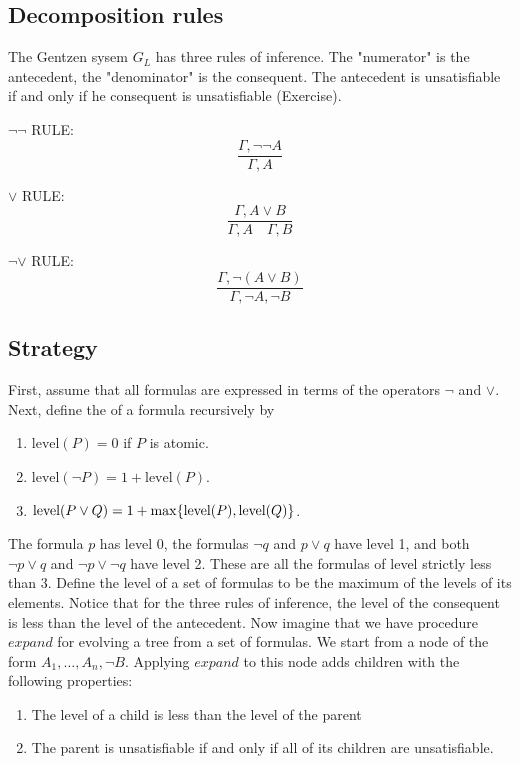 \subsection{Decomposition rules}

The Gentzen sysem $G_L$ has three rules of inference.    The "numerator" is the antecedent, the "denominator" is the consequent.  The antecedent is unsatisfiable if and only if he consequent is unsatisfiable (Exercise).

$\neg\neg$ RULE: $$\frac{\Gamma, \neg\neg A}{\Gamma, A} $$

$\lor$ RULE: $$\frac{\Gamma, A \lor B}{\Gamma, A \quad \Gamma, B} $$

$\neg\lor$ RULE: $$\frac{\Gamma, \neg(A \lor B)}{\Gamma, \neg A, \neg B} $$



\subsection{Strategy}


First, assume that all formulas are expressed in terms of the operators $\neg$ and $\lor$.  Next, define the  of a formula recursively by

\begin{enumerate}

\item $\text{level}(P) = 0$ if $P$ is atomic.

\item  $\text{level}(\neg P) = 1 + \text{level}(P)$.

\item  $\text{level}(P \lor Q) = 1 + \max \{ \text{level}(P), \text{level}(Q) \}$.

\end{enumerate}


The formula  $p$ has level 0, the formulas $\neg q$ and $p \lor q$ have  level 1, and both $\neg p \lor q$ and $\neg p \lor \neg q$ have level 2.  These are all the formulas of level strictly less than 3.  Define the level of a set of formulas to be the maximum of the levels of its elements.  Notice that for the three rules of inference, the level of the consequent is less than the level of the antecedent. Now imagine that we have procedure $expand$ for evolving a tree from a set of formulas. We start from a node of the form $A_1, \ldots, A_n, \neg B$.  Applying $expand$ to this node adds children with the following properties:

\begin{enumerate}
  \item The level of a child is less than the level of the parent
 \item  The parent is unsatisfiable if and only if all of its children are unsatisfiable.
\end{enumerate}

